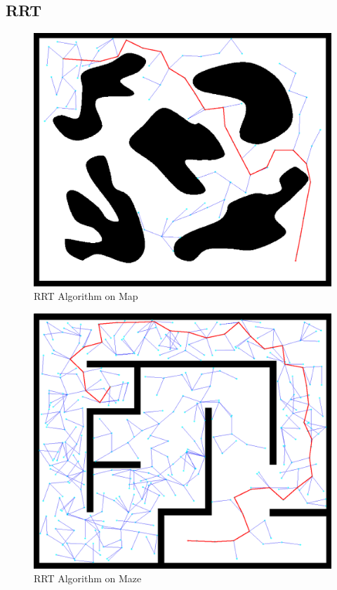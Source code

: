 \documentclass{article}
\begin{document}
	\subsection{RRT}
	
\begin{figure}[H]
\begin{center}
\includegraphics[scale=0.2]{rrtMap.png}
\caption{RRT Algorithm on Map}
\end{center}
\end{figure}	

\begin{figure}[H]
\begin{center}
\includegraphics[scale=0.2]{rrtMaze.png}
\caption{RRT Algorithm on Maze}
\end{center}
\end{figure}	
	
\end{document}
